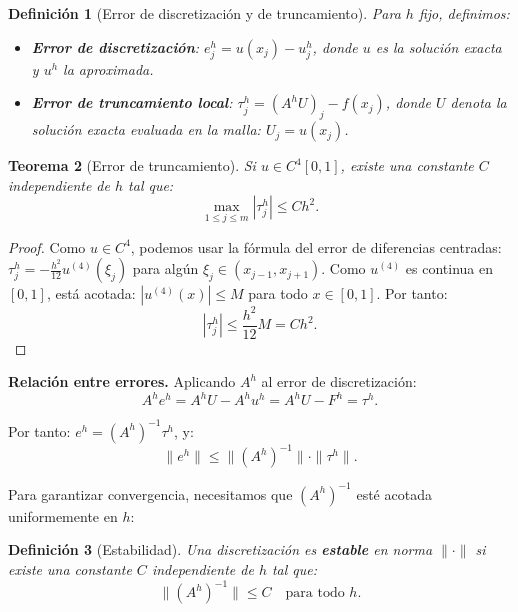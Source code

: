 \documentclass[a4paper,11pt]{report}
\newtheorem{theorem}{Teorema}[chapter]
\newtheorem{definition}[theorem]{Definición}
\begin{document}
\begin{definition}[Error de discretización y de truncamiento]
Para $h$ fijo, definimos:
\begin{itemize}
    \item \textbf{Error de discretización}: $e^h_j = u(x_j) - u^h_j$, donde $u$ es la solución exacta y $u^h$ la aproximada.
    \item \textbf{Error de truncamiento local}: $\tau^h_j = (A^h U)_j - f(x_j)$, donde $U$ denota la solución exacta evaluada en la malla: $U_j = u(x_j)$.
\end{itemize}
\end{definition}

\begin{theorem}[Error de truncamiento]
Si $u \in C^4[0,1]$, existe una constante $C$ independiente de $h$ tal que:
\[
\max_{1\le j \le m} \left| \tau^h_j \right| \leq C h^2.
\]
\end{theorem}
\begin{proof}
Como $u \in C^4$, podemos usar la fórmula del error de diferencias centradas: $\tau_j^h = -\frac{h^2}{12} u^{(4)}(\xi_j)$ para algún $\xi_j \in (x_{j-1}, x_{j+1})$. Como $u^{(4)}$ es continua en $[0,1]$, está acotada: $|u^{(4)}(x)| \leq M$ para todo $x \in [0,1]$. Por tanto:
\[
|\tau_j^h| \leq \frac{h^2}{12} M = C h^2.
\]
\end{proof}

\textbf{Relación entre errores.} Aplicando $A^h$ al error de discretización:
\[
A^h e^h = A^h U - A^h u^h = A^h U - F^h = \tau^h.
\]

Por tanto: $e^h = (A^h)^{-1} \tau^h$, y:
\[
\| e^h \| \leq \| (A^h)^{-1} \| \cdot \| \tau^h \|.
\]

Para garantizar convergencia, necesitamos que $(A^h)^{-1}$ esté acotada uniformemente en $h$:

\begin{definition}[Estabilidad]
Una discretización es \textbf{estable} en norma $\| \cdot \|$ si existe una constante $C$ independiente de $h$ tal que:
\[
\| (A^h)^{-1} \| \leq C \quad \text{para todo } h.
\]
\end{definition}
\end{document}
